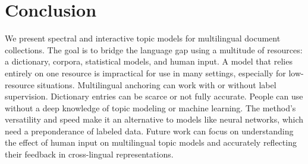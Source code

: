 \section{Conclusion}
\label{sec:conclusion}

We present spectral and interactive topic models for multilingual document collections.  The goal is to bridge the language gap using a multitude of resources: a dictionary, corpora, statistical models, and human input.  A model that relies entirely on one resource is impractical for use in many settings, especially for low-resource situations.  Multilingual anchoring can work with or without label supervision.  Dictionary entries can be scarce or not fully accurate.  People can use \mtanchor without a deep knowledge of topic modeling or machine learning.  The method's versatility and speed make it an alternative to models like neural networks, which need a preponderance of labeled data.  Future work can focus on understanding the effect of human input on multilingual topic models and accurately reflecting their feedback in cross-lingual representations.

